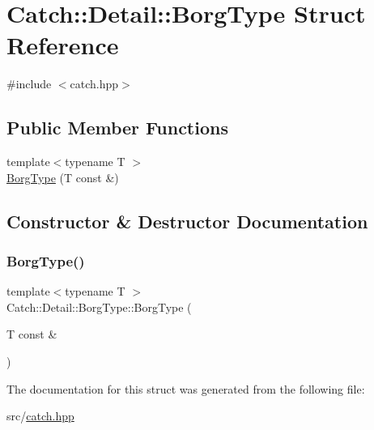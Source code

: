 \hypertarget{struct_catch_1_1_detail_1_1_borg_type}{}\section{Catch\+:\+:Detail\+:\+:Borg\+Type Struct Reference}
\label{struct_catch_1_1_detail_1_1_borg_type}


{\ttfamily \#include $<$catch.\+hpp$>$}

\subsection*{Public Member Functions}
\begin{DoxyCompactItemize}
\item 
{\footnotesize template$<$typename T $>$ }\\\hyperlink{struct_catch_1_1_detail_1_1_borg_type_a780a9946ed0d654f0bfc043c8fc505d8}{Borg\+Type} (T const \&)
\end{DoxyCompactItemize}


\subsection{Constructor \& Destructor Documentation}
\mbox{\label{struct_catch_1_1_detail_1_1_borg_type_a780a9946ed0d654f0bfc043c8fc505d8}} 
\subsubsection{\texorpdfstring{Borg\+Type()}{BorgType()}}
{\footnotesize\ttfamily template$<$typename T $>$ \\
Catch\+::\+Detail\+::\+Borg\+Type\+::\+Borg\+Type (\begin{DoxyParamCaption}\item[{T const \&}]{ }\end{DoxyParamCaption})}



The documentation for this struct was generated from the following file\+:\begin{DoxyCompactItemize}
\item 
src/\hyperlink{catch_8hpp}{catch.\+hpp}\end{DoxyCompactItemize}
